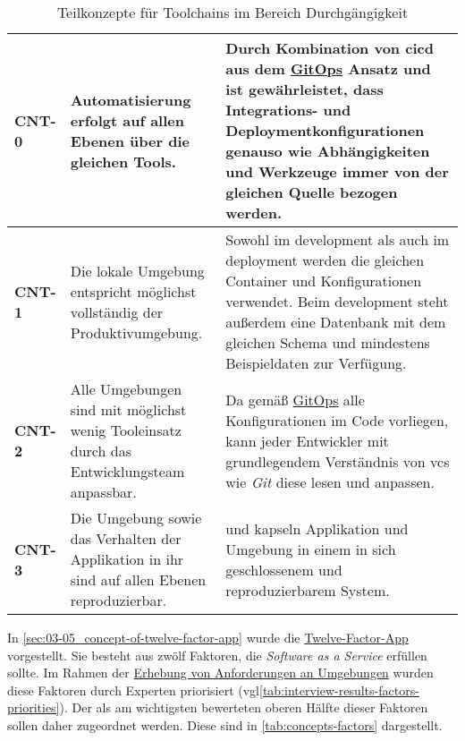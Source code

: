 \begin{table}[H]
    \begin{tabular}{ >{\bfseries\ttfamily}p{} >{}p{} | >{}p{} }
        CNT-0   &   Automatisierung erfolgt auf allen Ebenen über die gleichen Tools. &
        Durch Kombination von \Gls{cicd} aus dem \hyperref[sec:03-03_gitops]{GitOps} Ansatz und \nameref{sec:02-03_containerization} ist gewährleistet, dass Integrations- und Deploymentkonfigurationen genauso wie Abhängigkeiten und Werkzeuge immer von der gleichen Quelle bezogen werden. \\
        \hline
        CNT-1   &   Die lokale Umgebung entspricht möglichst vollständig der Produktivumgebung. &
        Sowohl im \Gls{development} als auch im \Gls{deployment} werden die gleichen Container und Konfigurationen verwendet. Beim \Gls{development} steht außerdem eine Datenbank mit dem gleichen Schema und mindestens Beispieldaten zur Verfügung. \\
        \hline
        CNT-2   &   Alle Umgebungen sind mit möglichst wenig Tooleinsatz durch das Entwicklungsteam anpassbar. &
        Da gemäß \hyperref[sec:03-03_gitops]{GitOps} alle Konfigurationen im Code vorliegen, kann jeder Entwickler mit grundlegendem Verständnis von \Gls{vcs} wie \textit{Git} diese lesen und anpassen. \\
        \hline
        CNT-3   &   Die Umgebung sowie das Verhalten der Applikation in ihr sind auf allen Ebenen reproduzierbar. &
        \nameref{subsec:05-01-01_docker-container} und \nameref{subsec:05-01-02_dev-container} kapseln Applikation und Umgebung in einem in sich geschlossenem und reproduzierbarem System. \\
    \end{tabular}
    \caption{Teilkonzepte für Toolchains im Bereich Durchgängigkeit}
    \label{tab:concepts-continuity}
\end{table}

In \autoref{sec:03-05_concept-of-twelve-factor-app} wurde die \hyperref[sec:03-05_concept-of-twelve-factor-app]{Twelve-Factor-App} vorgestellt. Sie besteht aus zwölf Faktoren, die \textit{Software as a Service} erfüllen sollte. Im Rahmen der \hyperref[sec:04-01_collection-of-requirements-using-expert-interviews]{Erhebung von Anforderungen an Umgebungen} wurden diese Faktoren durch Experten priorisiert (\acrshort{vgl}\autoref{tab:interview-results-factors-priorities}). Der als am wichtigsten bewerteten oberen Hälfte dieser Faktoren sollen daher  zugeordnet werden. Diese sind in \autoref{tab:concepts-factors} dargestellt.

